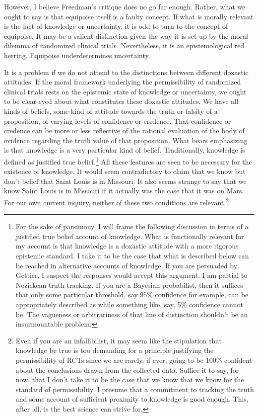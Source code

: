 \documentclass[letterpaper,notitlepage,12pt]{article}
\begin{document}
However, I believe Freedman's critique does no go far enough.
Rather, what we ought to say is that equipoise itself is a faulty concept.
If what is morally relevant is the fact of knowledge or uncertainty, it is odd
to turn to the concept of equipoise.
It may be a salient distinction given the way it is set up by the moral dilemma
of randomized clinical trials.
Nevertheless, it is an epistemological red herring.
Equipoise underdetermines uncertainty.

It is a problem if we do not attend to the distinctions between different
doxastic attitudes.
If the moral framework underlying the permissibility of randomized clinical
trials rests on the epistemic state of knowledge or uncertainty, we ought to be
clear-eyed about what constitutes these doxastic attitudes.
We have all kinds of beliefs, some kind of attitude towards the truth or falsity
of a proposition, of varying levels of confidence or credence.
That confidence or credence can be more or less reflective of the rational
evaluation of the body of evidence regarding the truth value of that
proposition.
What bears emphasizing is that knowledge is a very particular kind of belief.
Traditionally, knowledge is defined as justified true belief.\footnote{For the
  sake of parsimony, I will frame the following discussion in terms of a
  justified true belief account of knowledge. What is functionally relevant for
  my account is that knowledge is a doxastic attitude with a more rigorous
  epistemic standard. I take it to be the case that what is described below can
  be reached in alternative accounts of knowledge. If you are persuaded by
  Gettier, I suspect the responses would accept this argument. I am partial to
  Nozickean truth-tracking. If you are a Bayesian probabilist, then it suffices
  that only some particular threshold, say 95\% confidence for example, can be
  appropriately described as  while something like, say,
  5\% confidence cannot be. The vagueness or arbitrariness of that line of
distinction shouldn't be an insurmountable problem.}
All these features are seen to be necessary for the existence of knowledge.
It would seem contradictory to claim that we know but don't belief that Saint
Louis is in Missouri.
It also seems strange to say that we know Saint Louis is in Missouri if it
actually was the case that it was on Mars.
For our own current inquiry, neither of these two conditions are
relevant.\footnote{Even if you are an infallibilist, it may seem like the
  stipulation that knowledge be true is too demanding for a principle justifying
  the permissibility of RCTs since we are rarely, if ever, going to be 100\%
  confident about the conclusions drawn from the collected data. Suffice it to
  say, for now, that I don't take it to be the case that we know that we know
  for the standard of permissibility. I presume that a commitment to tracking
  the truth and some account of sufficient proximity to knowledge is good enough.
  This, after all, is the best science can strive for.}
\end{document}
